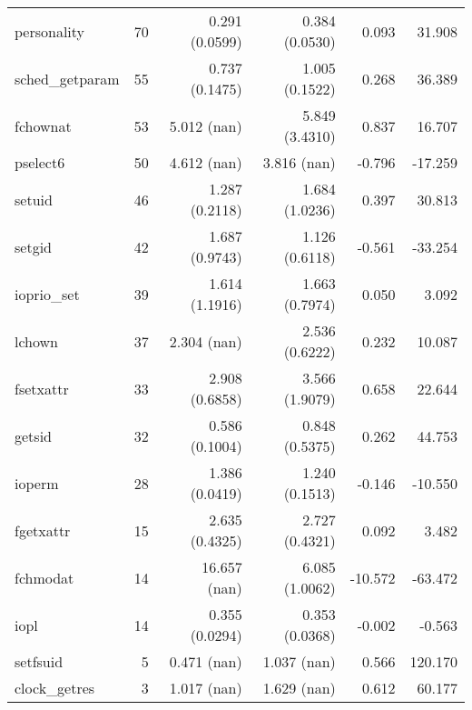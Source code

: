 \begin{longtable}{>{\ttfamily}lrrrrr}
                    personality &          70 &           0.291 (0.0599) &           0.384 (0.0530) &           0.093 &       31.908 \\
                sched\_getparam &          55 &           0.737 (0.1475) &           1.005 (0.1522) &           0.268 &       36.389 \\
                       fchownat &          53 &              5.012 (nan) &           5.849 (3.4310) &           0.837 &       16.707 \\
                       pselect6 &          50 &              4.612 (nan) &              3.816 (nan) &          -0.796 &      -17.259 \\
                         setuid &          46 &           1.287 (0.2118) &           1.684 (1.0236) &           0.397 &       30.813 \\
                         setgid &          42 &           1.687 (0.9743) &           1.126 (0.6118) &          -0.561 &      -33.254 \\
                    ioprio\_set &          39 &           1.614 (1.1916) &           1.663 (0.7974) &           0.050 &        3.092 \\
                         lchown &          37 &              2.304 (nan) &           2.536 (0.6222) &           0.232 &       10.087 \\
                      fsetxattr &          33 &           2.908 (0.6858) &           3.566 (1.9079) &           0.658 &       22.644 \\
                         getsid &          32 &           0.586 (0.1004) &           0.848 (0.5375) &           0.262 &       44.753 \\
                         ioperm &          28 &           1.386 (0.0419) &           1.240 (0.1513) &          -0.146 &      -10.550 \\
                      fgetxattr &          15 &           2.635 (0.4325) &           2.727 (0.4321) &           0.092 &        3.482 \\
                       fchmodat &          14 &             16.657 (nan) &           6.085 (1.0062) &         -10.572 &      -63.472 \\
                           iopl &          14 &           0.355 (0.0294) &           0.353 (0.0368) &          -0.002 &       -0.563 \\
                       setfsuid &           5 &              0.471 (nan) &              1.037 (nan) &           0.566 &      120.170 \\
                  clock\_getres &           3 &              1.017 (nan) &              1.629 (nan) &           0.612 &       60.177 \\
\end{longtable}
